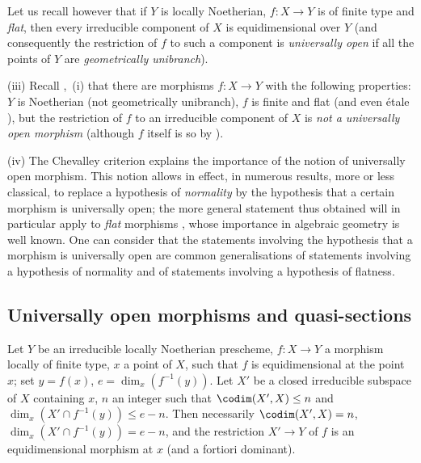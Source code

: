 \begin{remarks}[14.4.10]
Let us recall however  that if $Y$ is locally Noetherian, $f:X\to Y$ is of finite type and \emph{flat}, then every irreducible component of $X$ is equidimensional over $Y$ (and consequently the restriction of $f$ to such a component is \emph{universally open} if all the points of $Y$ are \emph{geometrically unibranch}).

(iii) Recall ,~(i) that there are morphisms $f:X\to Y$ with the following properties: $Y$ is Noetherian (not geometrically unibranch), $f$ is finite and flat (and even \'etale ), but the restriction of $f$ to an irreducible component of $X$ is \emph{not a universally open morphism} (although $f$ itself is so by ).

(iv) The Chevalley criterion  explains the importance of the notion of universally open morphism.
This notion allows in effect, in numerous results, more or less classical, to replace a hypothesis of \emph{normality} by the hypothesis that a certain morphism is universally open; the more general statement
thus obtained will in particular apply to \emph{flat} morphisms , whose importance in algebraic geometry is well known.
One can consider that the statements involving the hypothesis that a morphism is universally open are common generalisations of statements involving a hypothesis of normality and of statements involving a hypothesis of flatness.
\end{remarks}


\subsection{Universally open morphisms and quasi-sections}
\label{subsection:IV.14.5}

\begin{lemma}[14.5.1]
\label{IV.14.5.1}
Let $Y$ be an irreducible locally Noetherian prescheme, $f:X\to Y$ a morphism locally of finite type, $x$ a point of $X$, such that $f$ is equidimensional  at the point $x$; set $y=f(x)$, $e=\dim_x(f^{-1}(y))$.
Let $X'$ be a closed irreducible subspace of $X$ containing $x$, $n$ an integer such that $\codim(X',X)\leq n$ and $\dim_x(X'\cap f^{-1}(y))\leq e-n$.
Then necessarily $\codim(X',X)=n$, $\dim_x(X'\cap f^{-1}(y))=e-n$, and the restriction $X'\to Y$ of $f$ is an equidimensional morphism at $x$ (and a fortiori dominant).
\end{lemma}

